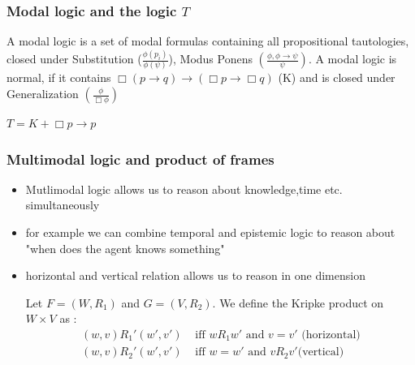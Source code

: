 \documentclass[hyperref={pdfpagelabels=false},t,10pt]{beamer}
\begin{document}
\begin{frame}
  \frametitle{Modal logic and the logic $T$}
  \begin{definition}
    A modal logic is a set of modal formulas containing all propositional tautologies, closed under Substitution ($\frac{\phi(p_i)}{\phi(\psi)}$), Modus Ponens $(\frac{\phi, \phi \rightarrow \psi}{\psi})$. \newline \newline \pause
    A modal logic is normal, if it contains $\Box (p \rightarrow q) \rightarrow (\Box p \rightarrow \Box q)$ (K) and is closed under Generalization $(\frac{\phi}{\Box \phi})$
  \end{definition}

  \begin{definition}
      $T = K + \Box p \rightarrow p$
  \end{definition}
\end{frame}



\begin{frame}
  \frametitle{Multimodal logic and product of frames}
  \begin{itemize}
    \item Mutlimodal logic allows us to reason about knowledge,time etc. simultaneously 
    \item for example we can combine temporal and epistemic logic to reason about "when does the agent knows something" \pause %
    \item horizontal and vertical relation allows us to reason in one dimension \pause%
    \begin{definition}
      Let $F = (W, R_1)$ and $G = (V, R_2)$. We define the Kripke product on $W \times V$ as : 
        \begin{align*}
              (w,v)R_1'(w',v') &\text{ iff } wR_1w' \mbox{ and } v = v' \text{  (horizontal)} \\
              (w,v)R_2  '(w',v') &\text{ iff } w = w' \mbox{ and } vR_2v' \text{(vertical)}
      \end{align*}  
    \end{definition}




  \end{itemize}
\end{frame}
\end{document}
